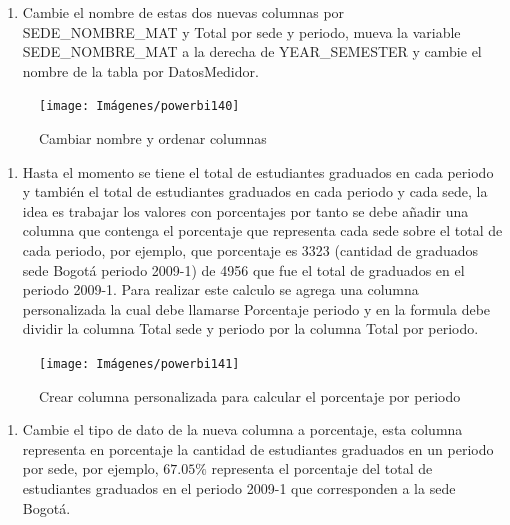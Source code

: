 \documentclass[
]{book}
\providecommand{\tightlist}{%
  \setlength{\itemsep}{0pt}\setlength{\parskip}{0pt}}
\begin{document}
\begin{enumerate}
\def\labelenumi{\arabic{enumi}.}
\setcounter{enumi}{7}
\tightlist
\item
  Cambie el nombre de estas dos nuevas columnas por SEDE\_NOMBRE\_MAT y Total por sede y periodo, mueva la variable SEDE\_NOMBRE\_MAT a la derecha de YEAR\_SEMESTER y cambie el nombre de la tabla por DatosMedidor.
\end{enumerate}

\begin{figure}

{\centering \texttt{[image: Imágenes/powerbi140]} 

}

\caption{Cambiar nombre y ordenar columnas}\label{fig:cambiarnombreyordenarcolumnas-fig}
\end{figure}

\begin{enumerate}
\def\labelenumi{\arabic{enumi}.}
\setcounter{enumi}{8}
\tightlist
\item
  Hasta el momento se tiene el total de estudiantes graduados en cada periodo y también el total de estudiantes graduados en cada periodo y cada sede, la idea es trabajar los valores con porcentajes por tanto se debe añadir una columna que contenga el porcentaje que representa cada sede sobre el total de cada periodo, por ejemplo, que porcentaje es 3323 (cantidad de graduados sede Bogotá periodo 2009-1) de 4956 que fue el total de graduados en el periodo 2009-1. Para realizar este calculo se agrega una columna personalizada la cual debe llamarse Porcentaje periodo y en la formula debe dividir la columna Total sede y periodo por la columna Total por periodo.
\end{enumerate}

\begin{figure}

{\centering \texttt{[image: Imágenes/powerbi141]} 

}

\caption{Crear columna personalizada para calcular el porcentaje por periodo}\label{fig:columnapersonalizadadeporcentajeperiodo-fig}
\end{figure}

\begin{enumerate}
\def\labelenumi{\arabic{enumi}.}
\setcounter{enumi}{9}
\tightlist
\item
  Cambie el tipo de dato de la nueva columna a porcentaje, esta columna representa en porcentaje la cantidad de estudiantes graduados en un periodo por sede, por ejemplo, \(67.05\%\) representa el porcentaje del total de estudiantes graduados en el periodo 2009-1 que corresponden a la sede Bogotá.
\end{enumerate}
\end{document}
